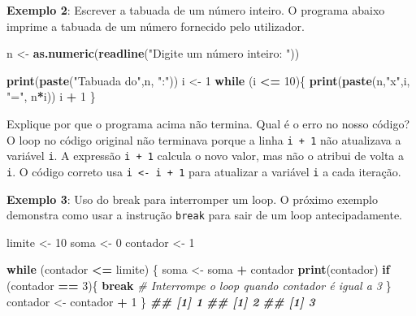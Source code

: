 \documentclass[
]{book}
\newenvironment{Shaded}{\begin{snugshade}}{\end{snugshade}}
\newcommand{\CommentTok}[1]{\textcolor[rgb]{0.56,0.35,0.01}{\textit{#1}}}
\newcommand{\ControlFlowTok}[1]{\textcolor[rgb]{0.13,0.29,0.53}{\textbf{#1}}}
\newcommand{\DecValTok}[1]{\textcolor[rgb]{0.00,0.00,0.81}{#1}}
\newcommand{\DocumentationTok}[1]{\textcolor[rgb]{0.56,0.35,0.01}{\textbf{\textit{#1}}}}
\newcommand{\FunctionTok}[1]{\textcolor[rgb]{0.13,0.29,0.53}{\textbf{#1}}}
\newcommand{\NormalTok}[1]{#1}
\newcommand{\OtherTok}[1]{\textcolor[rgb]{0.56,0.35,0.01}{#1}}
\newcommand{\SpecialCharTok}[1]{\textcolor[rgb]{0.81,0.36,0.00}{\textbf{#1}}}
\newcommand{\StringTok}[1]{\textcolor[rgb]{0.31,0.60,0.02}{#1}}
\begin{document}
\textbf{Exemplo 2}: Escrever a tabuada de um número inteiro. O programa
abaixo imprime a tabuada de um número fornecido pelo utilizador.

\begin{Shaded}
\begin{Highlighting}[]
\NormalTok{n }\OtherTok{\textless{}{-}} \FunctionTok{as.numeric}\NormalTok{(}\FunctionTok{readline}\NormalTok{(}\StringTok{"Digite um número inteiro: "}\NormalTok{))}

\FunctionTok{print}\NormalTok{(}\FunctionTok{paste}\NormalTok{(}\StringTok{"Tabuada do"}\NormalTok{,n, }\StringTok{":"}\NormalTok{))}
\NormalTok{i }\OtherTok{\textless{}{-}} \DecValTok{1}
\ControlFlowTok{while}\NormalTok{ (i }\SpecialCharTok{\textless{}=} \DecValTok{10}\NormalTok{)\{  }
  \FunctionTok{print}\NormalTok{(}\FunctionTok{paste}\NormalTok{(n,}\StringTok{"x"}\NormalTok{,i, }\StringTok{"="}\NormalTok{, n}\SpecialCharTok{*}\NormalTok{i))  }
\NormalTok{  i }\SpecialCharTok{+} \DecValTok{1}
\NormalTok{\}}
\end{Highlighting}
\end{Shaded}

Explique por que o programa acima não termina. Qual é o erro no nosso
código? O loop no código original não terminava porque a linha \texttt{i\ +\ 1}
não atualizava a variável \texttt{i}. A expressão \texttt{i\ +\ 1} calcula o novo valor,
mas não o atribui de volta a \texttt{i}. O código correto usa \texttt{i\ \textless{}-\ i\ +\ 1} para
atualizar a variável \texttt{i} a cada iteração.

\textbf{Exemplo 3}: Uso do break para interromper um loop. O próximo exemplo
demonstra como usar a instrução \texttt{break} para sair de um loop
antecipadamente.

\begin{Shaded}
\begin{Highlighting}[]
\NormalTok{limite }\OtherTok{\textless{}{-}} \DecValTok{10}
\NormalTok{soma }\OtherTok{\textless{}{-}} \DecValTok{0}
\NormalTok{contador }\OtherTok{\textless{}{-}} \DecValTok{1}

\ControlFlowTok{while}\NormalTok{ (contador }\SpecialCharTok{\textless{}=}\NormalTok{ limite) \{  }
\NormalTok{  soma }\OtherTok{\textless{}{-}}\NormalTok{ soma }\SpecialCharTok{+}\NormalTok{ contador  }
  \FunctionTok{print}\NormalTok{(contador)  }
  \ControlFlowTok{if}\NormalTok{ (contador }\SpecialCharTok{==} \DecValTok{3}\NormalTok{)\{    }
    \ControlFlowTok{break} \CommentTok{\# Interrompe o loop quando contador é igual a 3  }
\NormalTok{  \}  }
\NormalTok{  contador }\OtherTok{\textless{}{-}}\NormalTok{ contador }\SpecialCharTok{+} \DecValTok{1}
\NormalTok{\}}
\DocumentationTok{\#\# [1] 1}
\DocumentationTok{\#\# [1] 2}
\DocumentationTok{\#\# [1] 3}
\end{Highlighting}
\end{Shaded}
\end{document}
